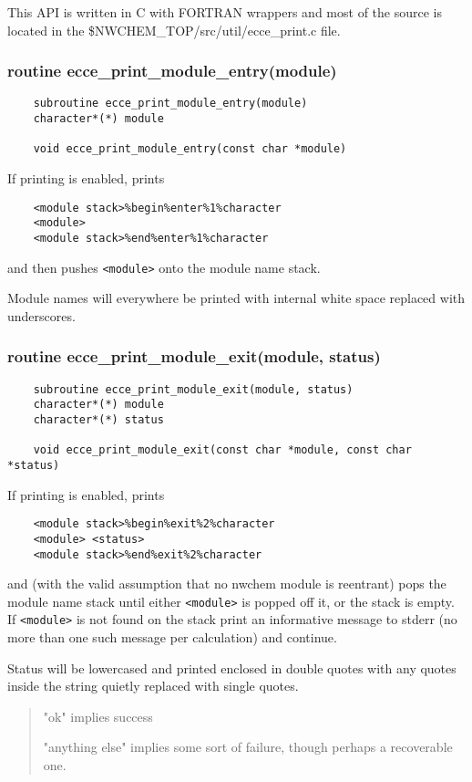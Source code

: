 This API is written in C with FORTRAN wrappers and most of the source is 
located in the 
\$NWCHEM\_TOP/src/util/ecce\_print.c file.

\subsubsection{  routine ecce\_print\_module\_entry(module)}

\begin{verbatim}
    subroutine ecce_print_module_entry(module)
    character*(*) module

    void ecce_print_module_entry(const char *module)
\end{verbatim} 
If printing is enabled, prints

\begin{verbatim}
    <module stack>%begin%enter%1%character
    <module>
    <module stack>%end%enter%1%character
\end{verbatim}
    and then pushes \verb+<module>+ onto the module name stack.  

    Module names will everywhere be printed with internal white space 
    replaced with underscores.

\subsubsection{routine ecce\_print\_module\_exit(module, status)}

\begin{verbatim}
    subroutine ecce_print_module_exit(module, status)
    character*(*) module
    character*(*) status

    void ecce_print_module_exit(const char *module, const char *status)
\end{verbatim}

    If printing is enabled, prints

\begin{verbatim}
    <module stack>%begin%exit%2%character
    <module> <status>
    <module stack>%end%exit%2%character
\end{verbatim}
    and (with the valid assumption that no nwchem module is reentrant) 
    pops the module name stack until either \verb+<module>+ is popped
    off it, or the stack is empty.  If \verb+<module>+ is not found on
    the stack print an informative message to stderr (no more than
    one such message per calculation) and continue.

    Status will be lowercased and printed enclosed in double quotes with 
    any quotes inside the string quietly replaced with single quotes.
\begin{quotation}

  "ok" implies success

  "anything else" implies some sort of failure, though perhaps a
  recoverable one.

\end{quotation}

